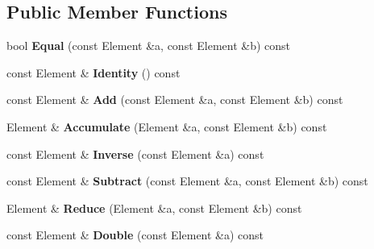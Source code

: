 \subsection*{Public Member Functions}
\begin{DoxyCompactItemize}
\item 
\hypertarget{class_euclidean_domain_of_a9c06ea0c5435d761cb42bff4fecdefe1}{
bool {\bfseries Equal} (const Element \&a, const Element \&b) const }
\label{class_euclidean_domain_of_a9c06ea0c5435d761cb42bff4fecdefe1}

\item 
\hypertarget{class_euclidean_domain_of_adb0fa01307ae40351be7e00663713a9a}{
const Element \& {\bfseries Identity} () const }
\label{class_euclidean_domain_of_adb0fa01307ae40351be7e00663713a9a}

\item 
\hypertarget{class_euclidean_domain_of_af9be8703b57c4eb3fca8371a5709ed61}{
const Element \& {\bfseries Add} (const Element \&a, const Element \&b) const }
\label{class_euclidean_domain_of_af9be8703b57c4eb3fca8371a5709ed61}

\item 
\hypertarget{class_euclidean_domain_of_a9fa4103ff0b31f33b1f039383c9ab57c}{
Element \& {\bfseries Accumulate} (Element \&a, const Element \&b) const }
\label{class_euclidean_domain_of_a9fa4103ff0b31f33b1f039383c9ab57c}

\item 
\hypertarget{class_euclidean_domain_of_ad78d5eeb2ec41658d48fdbf526af8fc3}{
const Element \& {\bfseries Inverse} (const Element \&a) const }
\label{class_euclidean_domain_of_ad78d5eeb2ec41658d48fdbf526af8fc3}

\item 
\hypertarget{class_euclidean_domain_of_a29808a9e90c45ce67743838856ad0259}{
const Element \& {\bfseries Subtract} (const Element \&a, const Element \&b) const }
\label{class_euclidean_domain_of_a29808a9e90c45ce67743838856ad0259}

\item 
\hypertarget{class_euclidean_domain_of_a86e05235bbeaf1bb248f8354f3900d4b}{
Element \& {\bfseries Reduce} (Element \&a, const Element \&b) const }
\label{class_euclidean_domain_of_a86e05235bbeaf1bb248f8354f3900d4b}

\item 
\hypertarget{class_euclidean_domain_of_a8c780e5c44eb5263e0115d02cd673725}{
const Element \& {\bfseries Double} (const Element \&a) const }
\label{class_euclidean_domain_of_a8c780e5c44eb5263e0115d02cd673725}


\end{DoxyCompactItemize}
